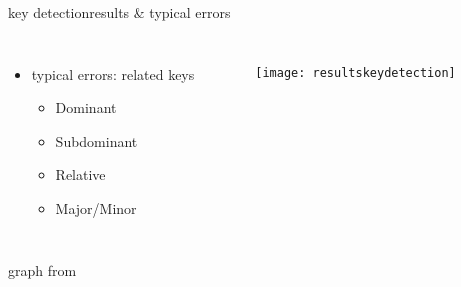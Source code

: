         \begin{frame}{key detection}{results \& typical errors}
            \begin{columns}[T]
                \begin{itemize}
                    \item	typical errors: related keys
                        \begin{itemize}
                            \item	Dominant
                            \item	Subdominant
                            \item	Relative
                            \item	Major/Minor
                        \end{itemize}
                \end{itemize}
                \begin{figure}
                    \centering
                        \texttt{[image: resultskeydetection]}
                \end{figure}
            \end{columns}
            \begin{flushright}
                graph from 
            \end{flushright}
        \end{frame}
                
